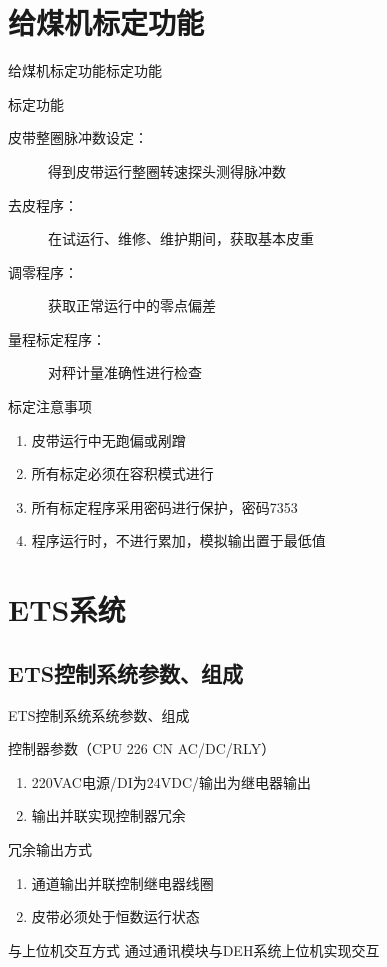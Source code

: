 \documentclass[12pt,hyperref={CJKbookmarks=true}]{beamer} %
\begin{document}
\section{给煤机标定功能}
	\begin{frame}{给煤机标定功能}{标定功能}
		
\begin{block}{标定功能}
				\begin{description}
				\item[皮带整圈脉冲数设定：]  得到皮带运行整圈转速探头测得脉冲数
\item[去皮程序：]在试运行、维修、维护期间，获取基本皮重
\item[调零程序：]获取正常运行中的零点偏差
\item[量程标定程序：]对秤计量准确性进行检查
			

				\end{description}
\end{block}
	\begin{block}{标定注意事项}
\begin{enumerate}
\item  皮带运行中无跑偏或剐蹭
				\item  所有标定必须在容积模式进行
				\item  所有标定程序采用密码进行保护，密码7353
				\item  程序运行时，不进行累加，模拟输出置于最低值
				\end{enumerate}
				
\end{block}
	\end{frame}
\section{ETS系统}
\subsection{ETS控制系统参数、组成}
\begin{frame}{ETS控制系统}{系统参数、组成}
  		\begin{block}{控制器参数（CPU 226 CN AC/DC/RLY）}
  		\begin{enumerate}
				\item 220VAC电源/DI为24VDC/输出为继电器输出
				\item  输出并联实现控制器冗余
			\end{enumerate}
\end{block}
\begin{exampleblock}{冗余输出方式}
  		\begin{enumerate}
				\item 通道输出并联控制继电器线圈
				\item  皮带必须处于恒数运行状态
			\end{enumerate}
\end{exampleblock}
\begin{alertblock}{与上位机交互方式}
  		通过通讯模块与DEH系统上位机实现交互
\end{alertblock}
	\end{frame}
\end{document}

